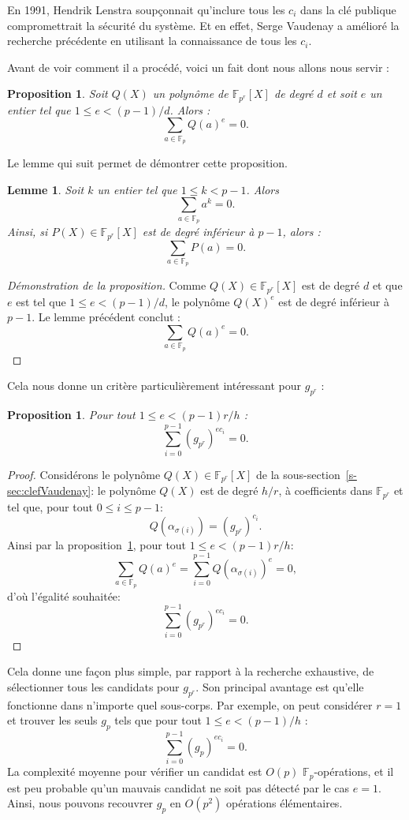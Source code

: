 \documentclass[a4paper, titlepage, 11pt]{article}
\newtheorem{lemm}[theo]{Lemme}
\newtheorem{prop}[theo]{Proposition}
\theoremstyle{definition}
\theoremstyle{remark}
\def\O{O}
\def\gf #1{\mathbb{F}_{#1}}
\begin{document}
En 1991, Hendrik Lenstra \cite{lenstra1991} soupçonnait qu'inclure tous les $c_i$ dans la clé publique compromettrait la sécurité du système. Et en effet, Serge Vaudenay a amélioré la recherche précédente en utilisant la connaissance de tous les $c_i$.

Avant de voir comment il a procédé, voici un fait dont nous allons nous servir :

\begin{prop}\label{prop:faitCool}
Soit $Q(X)$ un polynôme de $\gf{p^r}[X]$ de degré $d$ et soit $e$ un entier tel que $1 \leqslant e < (p-1)/d$. Alors : $$\sum_{a \in \gf{p}} Q(a)^e = 0.$$
\end{prop}
Le lemme qui suit permet de démontrer cette proposition.

\begin{lemm}
Soit $k$ un entier tel que $1 \leqslant k < p-1$. Alors
$$\sum_{a\in\gf{p}} a^k = 0.$$
Ainsi, si $P(X) \in \gf{p^r}[X]$ est de degré inférieur à $p-1$, alors : $$\sum_{a\in\gf{p}} P(a) = 0.$$
\end{lemm}

\begin{proof}[Démonstration de la proposition]
Comme $Q(X) \in \gf{p^r}[X]$ est de degré $d$ et que $e$ est tel que $1\leqslant e < (p-1)/d$, le polynôme $Q(X)^e$ est de degré inférieur à $p-1$. Le lemme précédent conclut :
$$\sum_{a\in\gf{p}} Q(a)^e = 0.$$
\end{proof}

Cela nous donne un critère particulièrement intéressant pour $g_{p^r}$ :
\begin{prop}
Pour tout $1 \leqslant e < (p-1)r/h$ :
$$\sum_{i=0}^{p-1} (g_{p^r})^{ec_i} = 0.$$
\end{prop}
\begin{proof}
Considérons le polynôme $Q(X)\in\gf{p^r}[X]$ de la sous-section~\ref{s-sec:clefVaudenay}: le polynôme $Q(X)$ est de degré $h/r$, à coefficients dans $\gf{p^r}$ et tel que, pour tout $0 \leqslant i \leqslant p-1$:
$$Q\left(\alpha_{\sigma(i)}\right) = (g_{p^r})^{c_i}.$$
Ainsi par la proposition~\ref{prop:faitCool}, pour tout $1 \leqslant e < (p-1)r/h$:
$$\sum_{a\in\gf{p}} Q(a)^e = \sum_{i=0}^{p-1} Q\left(\alpha_{\sigma(i)}\right)^e = 0,$$
d'où l'égalité souhaitée:
$$\sum_{i=0}^{p-1} (g_{p^r})^{ec_i} = 0.$$
\end{proof}
\noindent Cela donne une façon plus simple, par rapport à la recherche exhaustive, de sélectionner tous les candidats pour $g_{p^r}$. Son principal avantage est qu'elle fonctionne dans n'importe quel sous-corps. Par exemple, on peut considérer $r=1$ et trouver les seuls $g_p$ tels que pour tout $1 \leqslant e < (p-1)/h$ :
$$\sum_{i=0}^{p-1} (g_p)^{ec_i} = 0.$$
La complexité moyenne pour vérifier un candidat est $\O(p)$ $\gf{p}$-opérations, et il est peu probable qu'un mauvais candidat ne soit pas détecté par le cas $e = 1$. Ainsi, nous pouvons recouvrer $g_p$ en $\O(p^2)$ opérations élémentaires.
\end{document}
